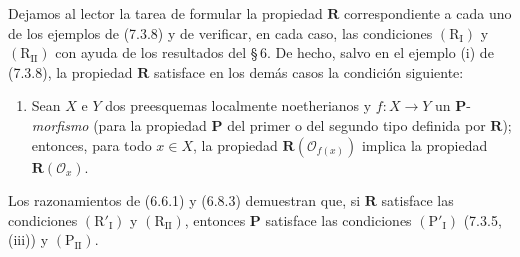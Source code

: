 \begin{remark}[7.3.11]
\label{IV.2.s7.3.11-fr}
Dejamos al lector la tarea de formular la propiedad $\boldsymbol R$
correspondiente a cada uno de los ejemplos de (7.3.8) y de verificar,
en cada caso, las condiciones $(\mathrm R_{\mathrm I})$ y
$(\mathrm R_{\mathrm{II}})$ con ayuda de los resultados del \S\,6.
De hecho, salvo en el ejemplo (i) de (7.3.8), la propiedad
$\boldsymbol R$ satisface en los demás casos la condición siguiente:
\begin{enumerate}
\item[$(\mathrm R'_{\mathrm I})$] Sean $X$ e $Y$ dos preesquemas
localmente noetherianos y $f:X\to Y$ un $\boldsymbol P$-\emph{morfismo}
(para la propiedad $\boldsymbol P$ del primer o del segundo tipo
definida por $\boldsymbol R$); entonces, para todo $x\in X$, la
propiedad $\boldsymbol R(\mathscr O_{f(x)})$ implica la propiedad
$\boldsymbol R(\mathscr O_x)$.
\end{enumerate}
Los razonamientos de (6.6.1) y (6.8.3) demuestran que, si
$\boldsymbol R$ satisface las condiciones $(\mathrm R'_{\mathrm I})$
y $(\mathrm R_{\mathrm{II}})$, entonces $\boldsymbol P$ satisface las
condiciones $(\mathrm P'_{\mathrm I})$ (7.3.5, (iii)) y
$(\mathrm P_{\mathrm{II}})$.
\end{remark}
